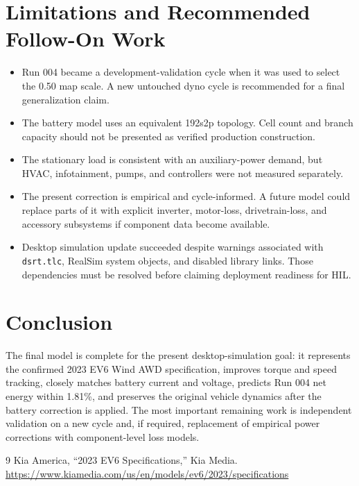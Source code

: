 \documentclass[11pt,letterpaper]{article}
\begin{document}
\clearpage
\section{Limitations and Recommended Follow-On Work}

\begin{itemize}
  \item Run 004 became a development-validation cycle when it was used to select
  the 0.50 map scale. A new untouched dyno cycle is recommended for a final
  generalization claim.
  \item The battery model uses an equivalent 192s2p topology. Cell count and
  branch capacity should not be presented as verified production construction.
  \item The stationary load is consistent with an auxiliary-power demand, but
  HVAC, infotainment, pumps, and controllers were not measured separately.
  \item The present correction is empirical and cycle-informed. A future model
  could replace parts of it with explicit inverter, motor-loss, drivetrain-loss,
  and accessory subsystems if component data become available.
  \item Desktop simulation update succeeded despite warnings associated with
  \texttt{dsrt.tlc}, RealSim system objects, and disabled library links. Those
  dependencies must be resolved before claiming deployment readiness for HIL.
\end{itemize}

\section{Conclusion}

The final model is complete for the present desktop-simulation goal: it
represents the confirmed 2023 EV6 Wind AWD specification, improves torque and
speed tracking, closely matches battery current and voltage, predicts Run 004
net energy within 1.81\%, and preserves the original vehicle dynamics after the
battery correction is applied. The most important remaining work is independent
validation on a new cycle and, if required, replacement of empirical power
corrections with component-level loss models.

\begin{thebibliography}{9}
Kia America, ``2023 EV6 Specifications,'' Kia Media.
\url{https://www.kiamedia.com/us/en/models/ev6/2023/specifications}
\end{thebibliography}
\end{document}
